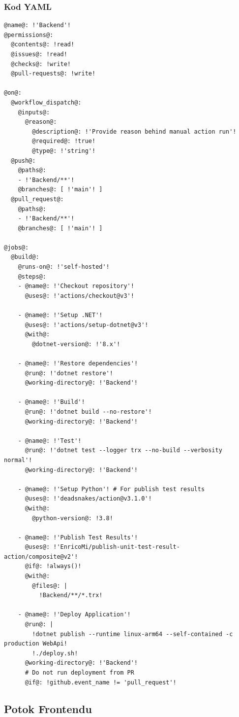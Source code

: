 \subsubsection{Kod YAML}
\begin{lstlisting}[style=yaml-colored]
@name@: !'Backend'!
@permissions@:
  @contents@: !read!
  @issues@: !read!
  @checks@: !write!
  @pull-requests@: !write!

@on@:
  @workflow_dispatch@:
    @inputs@:
      @reason@:
        @description@: !'Provide reason behind manual action run'!
        @required@: !true!
        @type@: !'string'!
  @push@:
    @paths@:
    - !'Backend/**'!
    @branches@: [ !'main'! ]
  @pull_request@:
    @paths@:
    - !'Backend/**'!
    @branches@: [ !'main'! ]

@jobs@:
  @build@:
    @runs-on@: !'self-hosted'!
    @steps@:
    - @name@: !'Checkout repository'!
      @uses@: !'actions/checkout@v3'!

    - @name@: !'Setup .NET'!
      @uses@: !'actions/setup-dotnet@v3'!
      @with@:
        @dotnet-version@: !'8.x'!

    - @name@: !'Restore dependencies'!
      @run@: !'dotnet restore'!
      @working-directory@: !'Backend'!

    - @name@: !'Build'!
      @run@: !'dotnet build --no-restore'!
      @working-directory@: !'Backend'!

    - @name@: !'Test'!
      @run@: !'dotnet test --logger trx --no-build --verbosity normal'!
      @working-directory@: !'Backend'!

    - @name@: !'Setup Python'! # For publish test results
      @uses@: !'deadsnakes/action@v3.1.0'!
      @with@:
        @python-version@: !3.8!

    - @name@: !'Publish Test Results'!
      @uses@: !'EnricoMi/publish-unit-test-result-action/composite@v2'!
      @if@: !always()!
      @with@:
        @files@: |
          !Backend/**/*.trx!

    - @name@: !'Deploy Application'!
      @run@: |
        !dotnet publish --runtime linux-arm64 --self-contained -c production WebApi!
        !./deploy.sh!
      @working-directory@: !'Backend'!
      # Do not run deployment from PR
      @if@: !github.event_name != 'pull_request'!
\end{lstlisting}

\subsection{Potok Frontendu}
\label{subsec:potok-frontendu}

